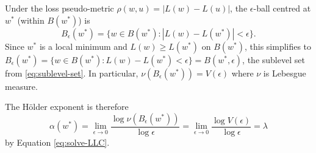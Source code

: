 \documentclass[11pt]{article}
\begin{document}
\begin{solution}
    Under the loss pseudo-metric $\rho(w,u) = |L(w) - L(u)|$, the
    $\epsilon$-ball centred at $w^*$ (within $B(w^*)$) is
    \begin{equation*}
        B_\epsilon(w^*)
        = \{w \in B(w^*) : |L(w) - L(w^*)| < \epsilon\}.
    \end{equation*}
    Since $w^*$ is a local minimum and $L(w) \geq L(w^*)$ on $B(w^*)$,
    this simplifies to
    $B_\epsilon(w^*) = \{w \in B(w^*) : L(w) - L(w^*) < \epsilon\}
    = B(w^*,\epsilon)$, the sublevel set from \eqref{eq:sublevel-set}. In
    particular, $\nu(B_\epsilon(w^*)) = V(\epsilon)$ where $\nu$ is
    Lebesgue measure.

    The H\"older exponent is therefore
    \begin{equation*}
        \alpha(w^*)
        = \lim_{\epsilon\to 0}
            \frac{\log \nu(B_\epsilon(w^*))}{\log\epsilon}
        = \lim_{\epsilon\to 0}
            \frac{\log V(\epsilon)}{\log\epsilon} = \lambda
    \end{equation*}
    by Equation \eqref{eq:solve-LLC}.
    
\end{solution}
\end{document}
